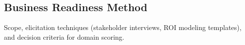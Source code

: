 \subsection{Business Readiness Method}
Scope, elicitation techniques (stakeholder interviews, ROI modeling templates), and decision criteria for domain scoring.



